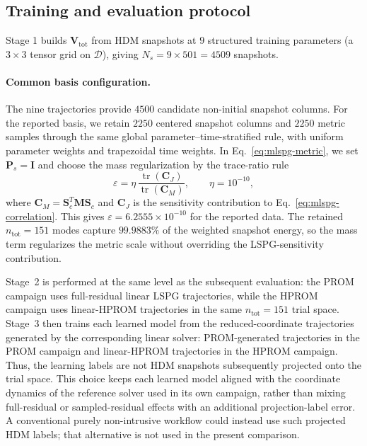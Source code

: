 \documentclass[11pt]{article}
\begin{document}
\subsection{Training and evaluation protocol}
\label{sec:training-protocol}
Stage 1 builds $\mathbf V_{\mathrm{tot}}$ from HDM snapshots at $9$ structured
training parameters (a $3\times3$ tensor grid on $\mathcal D$), giving
$N_s=9\times501=4509$ snapshots.

\paragraph{Common basis configuration.}
The nine trajectories provide $4500$ candidate non-initial snapshot columns.
For the reported basis, we retain $2250$ centered snapshot columns and $2250$
metric samples through the same global parameter--time-stratified rule, with
uniform parameter weights and trapezoidal time weights.  In
Eq.~\eqref{eq:mlspg-metric}, we set $\mathbf P_s=\mathbf I$ and choose the
mass regularization by the trace-ratio rule
\begin{equation}
  \varepsilon = \eta\,\frac{\operatorname{tr}(\mathbf C_J)}
  {\operatorname{tr}(\mathbf C_M)},
  \qquad \eta=10^{-10},
  \label{eq:metric-trace-ratio}
\end{equation}
where $\mathbf C_M=\mathbf S_c^T\mathbf M\mathbf S_c$ and $\mathbf C_J$
is the sensitivity contribution to Eq.~\eqref{eq:mlspg-correlation}.  This
gives $\varepsilon=6.2555\times10^{-10}$ for the reported data.  The retained
$n_{\mathrm{tot}}=151$ modes capture $99.9883\%$ of the weighted snapshot
energy, so the mass term regularizes the metric scale without overriding the
LSPG-sensitivity contribution.

Stage~2 is performed at the same level as
the subsequent evaluation: the PROM campaign uses full-residual linear LSPG
trajectories, while the HPROM campaign uses linear-HPROM trajectories in the
same $n_{\mathrm{tot}}=151$ trial space.  Stage~3 then trains each learned
model from the reduced-coordinate trajectories
generated by the corresponding linear solver: PROM-generated trajectories in
the PROM campaign and linear-HPROM trajectories in the HPROM campaign.  Thus,
the learning labels are not HDM snapshots subsequently projected onto the
trial space.  This choice keeps each learned model aligned with the coordinate
dynamics of the reference solver used in its own campaign, rather than mixing
full-residual or sampled-residual effects with an additional projection-label
error.  A conventional purely non-intrusive workflow could instead use such
projected HDM labels; that alternative is not used in the present comparison.
\end{document}
